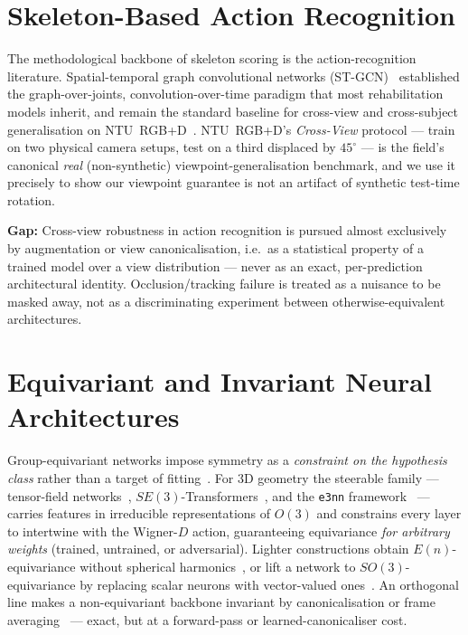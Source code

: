 \documentclass[11pt]{article}
\newcommand{\gap}[1]{\textbf{\textcolor{red!60!black}{Gap:} } #1}
\begin{document}
\section{Skeleton-Based Action Recognition}
\label{sec:action}

The methodological backbone of skeleton scoring is the action-recognition
literature. Spatial-temporal graph convolutional networks (ST-GCN)~\cite{yan2018stgcn}
established the graph-over-joints, convolution-over-time paradigm that most
rehabilitation models inherit, and remain the standard baseline for cross-view and
cross-subject generalisation on NTU~RGB+D~\cite{shahroudy2016ntu}. NTU~RGB+D's
\emph{Cross-View} protocol --- train on two physical camera setups, test on a third
displaced by $45^\circ$ --- is the field's canonical \emph{real} (non-synthetic)
viewpoint-generalisation benchmark, and we use it precisely to show our viewpoint
guarantee is not an artifact of synthetic test-time rotation.

\gap{Cross-view robustness in action recognition is pursued almost exclusively by
augmentation or view canonicalisation, i.e.\ as a statistical property of a trained
model over a view distribution --- never as an exact, per-prediction architectural
identity. Occlusion/tracking failure is treated as a nuisance to be masked away,
not as a discriminating experiment between otherwise-equivalent architectures.}

\section{Equivariant and Invariant Neural Architectures}
\label{sec:equiv}

Group-equivariant networks impose symmetry as a \emph{constraint on the hypothesis
class} rather than a target of fitting~\cite{cohen2016gconv}. For $3$D geometry the
steerable family --- tensor-field networks~\cite{thomas2018tfn},
$SE(3)$-Transformers~\cite{fuchs2020se3transformer}, and the \texttt{e3nn}
framework~\cite{geiger2022e3nn} --- carries features in irreducible representations
of $O(3)$ and constrains every layer to intertwine with the Wigner-$D$ action,
guaranteeing equivariance \emph{for arbitrary weights} (trained, untrained, or
adversarial). Lighter constructions obtain $E(n)$-equivariance without spherical
harmonics~\cite{satorras2021egnn}, or lift a network to $SO(3)$-equivariance by
replacing scalar neurons with vector-valued ones~\cite{deng2021vectorneurons}. An
orthogonal line makes a non-equivariant backbone invariant by canonicalisation or
frame averaging~\cite{puny2022frameaveraging} --- exact, but at a forward-pass or
learned-canonicaliser cost.
\end{document}
